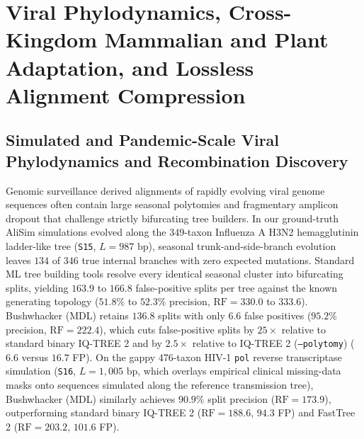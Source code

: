 \documentclass[11pt,a4paper]{article}
\begin{document}
\section{Viral Phylodynamics, Cross-Kingdom Mammalian and Plant Adaptation, and Lossless Alignment Compression}

\subsection{Simulated and Pandemic-Scale Viral Phylodynamics and Recombination Discovery}

Genomic surveillance derived alignments of rapidly evolving viral genome sequences often contain large seasonal polytomies and fragmentary amplicon dropout that challenge strictly bifurcating tree builders. In our ground-truth AliSim simulations evolved along the 349-taxon Influenza A H3N2 hemagglutinin ladder-like tree (\texttt{S15}, $L = 987\text{ bp}$), seasonal trunk-and-side-branch evolution leaves $134$ of $346$ true internal branches with zero expected mutations. Standard ML tree building tools resolve every identical seasonal cluster into bifurcating splits, yielding $163.9$ to $166.8$ false-positive splits per tree against the known generating topology ($51.8\%$ to $52.3\%$ precision, $\text{RF} = 330.0$ to $333.6$). Bushwhacker (MDL) retains $136.8$ splits with only $6.6$ false positives ($95.2\%$ precision, $\text{RF} = 222.4$), which cuts false-positive splits by $25\times$ relative to standard binary IQ-TREE 2 and by $2.5\times$ relative to IQ-TREE 2 (\texttt{--polytomy}) ($6.6$ versus $16.7$ FP). On the gappy 476-taxon HIV-1 \texttt{pol} reverse transcriptase simulation (\texttt{S16}, $L = 1,005\text{ bp}$, which overlays empirical clinical missing-data masks onto sequences simulated along the reference transmission tree), Bushwhacker (MDL) similarly achieves $90.9\%$ split precision ($\text{RF} = 173.9$), outperforming standard binary IQ-TREE 2 ($\text{RF} = 188.6$, $94.3$ FP) and FastTree 2 ($\text{RF} = 203.2$, $101.6$ FP).
\end{document}

